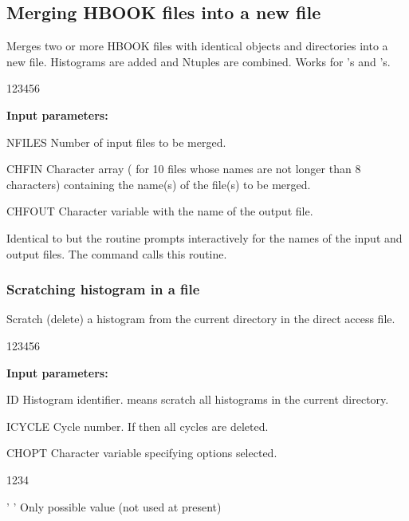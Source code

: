 \subsection*{Merging HBOOK files into a new file}
 

\Action
Merges two or more HBOOK files with identical objects
and directories into a new file.
Histograms are added and Ntuples are combined. 
Works for \CWN's and \RWN's.

\begin{DLtt}{123456}
\item[{\rm\bf Input parameters:}]
\item[NFILES] Number of input files to be merged.
\item[CHFIN] Character array (\eg {} for 10
             files whose names are not longer than 8 characters)
             containing the name(s) of the file(s) to be merged.
\item[CHFOUT] Character variable with the name of the output file.
\end{DLtt}
 

\Action
Identical to  but the routine prompts interactively
for the names of the input and output files.
The \PAW{} command  calls this routine.

\subsubsection*{\label{HSCRATCH}Scratching histogram in a file}
 
 
\Action
Scratch (delete) a histogram from the current directory in the direct
access file.
 
\begin{DLtt}{123456}
\item[{\rm\bf Input parameters:}]
\item[ID]
Histogram identifier.
 means scratch all histograms in the current directory.
\item[ICYCLE]
Cycle number. If  then all cycles are deleted.
\item[CHOPT]
Character variable specifying options selected.
\begin{DLtt}{1234}
\item[' '] Only possible value (not used at present)
\end{DLtt}
\end{DLtt}
 
